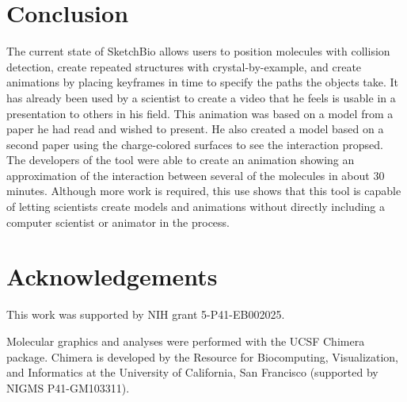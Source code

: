 \documentclass{article} %
\begin{document}
\section{Conclusion}
The current state of SketchBio allows users to position molecules with collision detection, create repeated structures with crystal-by-example, and create animations by placing keyframes in time to specify the paths the objects take.  It has already been used by a scientist to create a video that he feels is usable in a presentation to others in his field.  This animation was based on a model from a paper he had read and wished to present.  He also created a model based on a second paper using the charge-colored surfaces to see the interaction propsed.  The developers of the tool were able to create an animation showing an approximation of the interaction between several of the molecules in about 30 minutes.  Although more work is required, this use shows that this tool is capable of letting scientists create models and animations without directly including a computer scientist or animator in the process.

\section{Acknowledgements}
This work was supported by NIH grant 5-P41-EB002025.

Molecular graphics and analyses were performed with the UCSF Chimera package. Chimera is developed by the Resource for Biocomputing, Visualization, and Informatics at the University of California, San Francisco (supported by NIGMS P41-GM103311).



\end{document}
